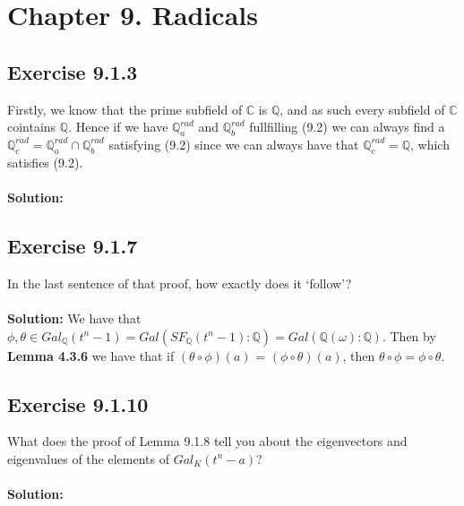 \documentclass{article}
\begin{document}
\section*{Chapter 9. Radicals}
\subsection*{Exercise 9.1.3}
Firstly, we know that the prime subfield of $\mathbb{C}$ is $\mathbb{Q}$, and as such every subfield of $\mathbb{C}$ cointains $\mathbb{Q}$.
Hence if we have $\mathbb{Q}^{rad}_a$ and $\mathbb{Q}^{rad}_b$ fullfilling (9.2) we can always find a $\mathbb{Q}^{rad}_c = \mathbb{Q}^{rad}_a \cap \mathbb{Q}^{rad}_b$
satisfying (9.2) since we can always have that $\mathbb{Q}^{rad}_c = \mathbb{Q}$, which satisfies (9.2).
\\\\
\textbf{Solution:}

\subsection*{Exercise 9.1.7}
In the last sentence of that proof, how exactly does it `follow'?
\\\\
\textbf{Solution:}
We have that $\phi , \theta \in Gal_{\mathbb{Q}}(t^n - 1) = Gal(SF_{\mathbb{Q}}(t^n - 1): \mathbb{Q}) = Gal(\mathbb{Q}(\omega): \mathbb{Q})$.
Then by \textbf{Lemma 4.3.6} we have that if $(\theta \circ \phi)(a)$ = $(\phi \circ \theta)(a)$, then $\theta \circ \phi = \phi \circ \theta$.

\subsection*{Exercise 9.1.10}
What does the proof of Lemma 9.1.8 tell you about the eigenvectors and eigenvalues of the elements of $Gal_K(t^n-a)$?
\\\\
\textbf{Solution:}
\end{document}
